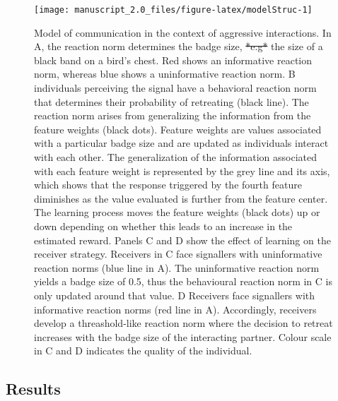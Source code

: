 \documentclass[
  12pt,
]{article}
\providecommand{\DIFaddtex}[1]{{\protect\color{blue}\uwave{#1}}} %
\providecommand{\DIFdeltex}[1]{{\protect\color{red}\sout{#1}}}                      %
\providecommand{\DIFaddFL}[1]{\DIFadd{#1}} %
\providecommand{\DIFdelFL}[1]{\DIFdel{#1}} %
\providecommand{\DIFaddbeginFL}{} %
\providecommand{\DIFaddendFL}{} %
\providecommand{\DIFdelbeginFL}{} %
\providecommand{\DIFdelendFL}{} %
\providecommand{\DIFadd}[1]{\texorpdfstring{\DIFaddtex{#1}}{#1}} %
\providecommand{\DIFdel}[1]{\texorpdfstring{\DIFdeltex{#1}}{}} %
\newcommand{\DIFscaledelfig}{0.5}
\newlength{\DIFdelgraphicswidth} %
\newlength{\DIFdelgraphicsheight} %
\newcommand{\DIFaddincludegraphics}[2][]{{\color{blue}\fbox{\DIFOincludegraphics[#1]{#2}}}} %
\newcommand{\DIFdelincludegraphics}[2][]{%
\sbox{\DIFdelgraphicsbox}{\DIFOincludegraphics[#1]{#2}}%
\settoboxwidth{\DIFdelgraphicswidth}{\DIFdelgraphicsbox} %
\settoboxtotalheight{\DIFdelgraphicsheight}{\DIFdelgraphicsbox} %
\scalebox{\DIFscaledelfig}{%
\parbox[b]{\DIFdelgraphicswidth}{\usebox{\DIFdelgraphicsbox}\\[-\baselineskip] \rule{\DIFdelgraphicswidth}{0em}}\llap{\resizebox{\DIFdelgraphicswidth}{\DIFdelgraphicsheight}{%
\setlength{\unitlength}{\DIFdelgraphicswidth}%
\begin{picture}(1,1)%
\thicklines\linethickness{2pt} %
{\color[rgb]{1,0,0}\put(0,0){\framebox(1,1){}}}%
{\color[rgb]{1,0,0}\put(0,0){\line( 1,1){1}}}%
{\color[rgb]{1,0,0}\put(0,1){\line(1,-1){1}}}%
\end{picture}%
}\hspace*{3pt}}} %
} %
\DeclareRobustCommand{\DIFaddbeginFL}{\DIFOaddbeginFL \let\includegraphics\DIFaddincludegraphics} %
\DeclareRobustCommand{\DIFaddendFL}{\DIFOaddendFL \let\includegraphics\DIFOincludegraphics} %
\DeclareRobustCommand{\DIFdelbeginFL}{\DIFOdelbeginFL \let\includegraphics\DIFdelincludegraphics} %
\DeclareRobustCommand{\DIFdelendFL}{\DIFOaddendFL \let\includegraphics\DIFOincludegraphics} %
\begin{document}
\begin{figure}

{\centering \DIFdelbeginFL %
\DIFdelendFL \DIFaddbeginFL \texttt{[image: manuscript\_2.0\_files/figure-latex/modelStruc-1]} 

\DIFaddendFL 

}

\caption{Model of communication in the context of aggressive interactions. In A, the reaction norm  \DIFaddbeginFL \DIFaddFL{(equation \ref{eq:reacNorm}) }\DIFaddendFL determines the badge size, \DIFdelbeginFL \DIFdelFL{*e.g* }\DIFdelendFL \DIFaddbeginFL \textit{\DIFaddFL{e.g}} \DIFaddendFL the size of a black band on a bird's chest. Red shows an informative reaction norm, whereas blue shows a uninformative reaction norm. B individuals perceiving the signal have a behavioral reaction norm that determines their probability of retreating (black line). The reaction norm arises from generalizing the information from the \DIFaddbeginFL \DIFaddFL{policy }\DIFaddendFL feature weights (black dots). Feature weights are values associated with a particular badge size and are updated as individuals interact with each other. The generalization of the information associated with each feature weight is represented by the grey line and its axis, which shows that the response triggered by the fourth feature diminishes as the value evaluated is further from the feature center. The learning process moves the feature weights (black dots) up or down depending on whether this leads to an increase in the estimated reward. Panels C and D show the effect of learning on the receiver strategy. Receivers in C face signallers with uninformative reaction norms (blue line in A). The uninformative reaction norm yields a badge size of 0.5, thus the behavioural reaction norm in C is only updated around that value. D Receivers face signallers with informative reaction norms (red line in A). Accordingly, receivers develop a threashold-like reaction norm where the decision to retreat increases with the badge size of the interacting partner. Colour scale in C and D indicates the quality of the individual.}\label{fig:modelStruc}
\end{figure}

\hypertarget{results}{%
\subsection{Results}\label{results}}
\end{document}
